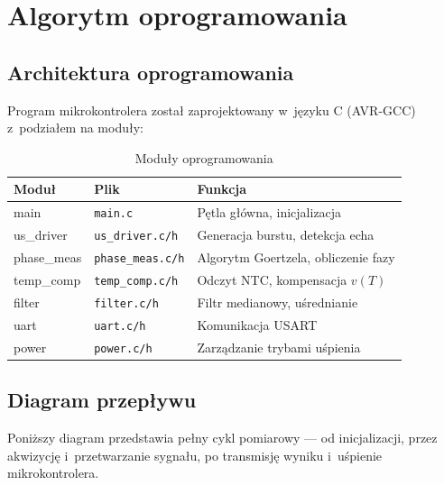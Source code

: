 \documentclass[a4paper,11pt]{article}
\begin{document}
\clearpage
\section{Algorytm oprogramowania}
\label{sec:algorytm}

\subsection{Architektura oprogramowania}

Program mikrokontrolera został zaprojektowany w~języku C (AVR-GCC) z~podziałem
na moduły:

\begin{table}[H]
    \centering
    \caption{Moduły oprogramowania}
    \label{tab:moduly_sw}
    \begin{tabular}{lll}
        \toprule
        \textbf{Moduł} & \textbf{Plik} & \textbf{Funkcja} \\
        \midrule
        main & \texttt{main.c} & Pętla główna, inicjalizacja \\
        us\_driver & \texttt{us\_driver.c/h} & Generacja burstu, detekcja echa \\
        phase\_meas & \texttt{phase\_meas.c/h} & Algorytm Goertzela, obliczenie fazy \\
        temp\_comp & \texttt{temp\_comp.c/h} & Odczyt NTC, kompensacja $v(T)$ \\
        filter & \texttt{filter.c/h} & Filtr medianowy, uśrednianie \\
        uart & \texttt{uart.c/h} & Komunikacja USART \\
        power & \texttt{power.c/h} & Zarządzanie trybami uśpienia \\
        \bottomrule
    \end{tabular}
\end{table}

\subsection{Diagram przepływu}

\noindent Poniższy diagram przedstawia pełny cykl pomiarowy --- od inicjalizacji,
przez akwizycję i~przetwarzanie sygnału, po transmisję wyniku i~uśpienie mikrokontrolera.
\end{document}
